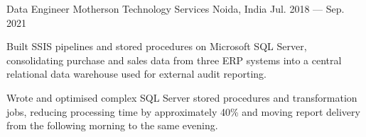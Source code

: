 \begin{cventries}
  \cventry
    {Data Engineer}
    {Motherson Technology Services}
    {Noida, India}
    {Jul. 2018 --- Sep. 2021}
    {
      \begin{cvitems}
        \item {Built SSIS pipelines and stored procedures on Microsoft SQL Server, consolidating purchase and sales data from three ERP systems into a central relational data warehouse used for external audit reporting.}
        \item {Wrote and optimised complex SQL Server stored procedures and transformation jobs, reducing processing time by approximately 40\% and moving report delivery from the following morning to the same evening.}
      \end{cvitems}
    }

\end{cventries}